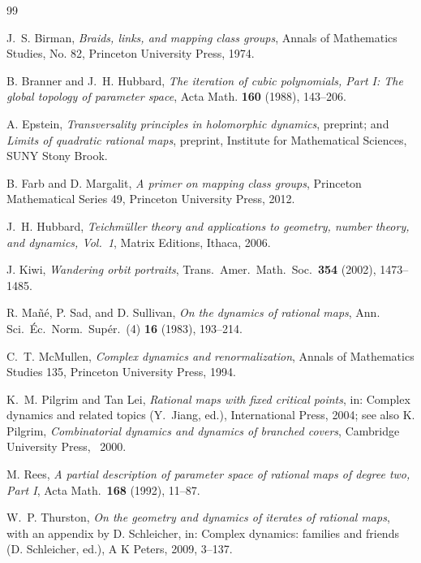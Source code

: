 \documentclass[11pt]{amsart}
\theoremstyle{plain}
\theoremstyle{definition}
\begin{document}
\begin{thebibliography}{99}

 J.~S. Birman, \emph{Braids, links, and mapping class
groups}, Annals of Mathematics Studies, No. 82, Princeton University
Press, 1974.

 B. Branner and J.~H. Hubbard, \emph{The iteration of cubic
polynomials, Part I: The global topology of parameter space}, Acta Math.
\textbf{160} (1988), 143--206.

 A. Epstein, \emph{Transversality principles
in holomorphic dynamics}, preprint; and \emph{Limits of quadratic rational
maps}, preprint, Institute for Mathematical Sciences, SUNY Stony Brook.

 B. Farb and D. Margalit, \emph{A primer on mapping class
groups}, Princeton Mathematical Series 49, Princeton University Press,
2012.

 J.~H. Hubbard, \emph{Teichm\"uller theory and
applications to geometry, number theory, and dynamics, Vol.~1}, Matrix
Editions, Ithaca, 2006.

 J. Kiwi, \emph{Wandering orbit portraits}, Trans.\ Amer.\
Math.\ Soc.\ \textbf{354} (2002), 1473--1485.

 R. Ma\~n\'e, P. Sad, and D. Sullivan, \emph{On the dynamics
of rational maps}, Ann. Sci.\ \'Ec.\ Norm.\ Sup\'er.\ (4) \textbf{16}
(1983), 193--214.

 C.~T. McMullen, \emph{Complex dynamics and
renormalization}, Annals of Mathematics Studies 135, Princeton University
Press, 1994.

 K.~M. Pilgrim and Tan Lei, \emph{Rational maps with
fixed critical points}, in: Complex dynamics and related topics (Y.~Jiang,
ed.), International Press, 2004; see also K. Pilgrim, \emph{Combinatorial
dynamics and dynamics of branched covers}, Cambridge University Press,
~2000.

 M. Rees, \emph{A partial description of parameter space of
rational maps of degree two, Part I}, Acta Math.\ \textbf{168} (1992),
11--87.

 W.~P. Thurston, \emph{On the geometry and dynamics of
iterates of rational maps}, with an appendix by D. Schleicher, in: Complex
dynamics: families and friends (D. Schleicher, ed.), A K Peters, 2009,
3--137.

\end{thebibliography}
\end{document}
